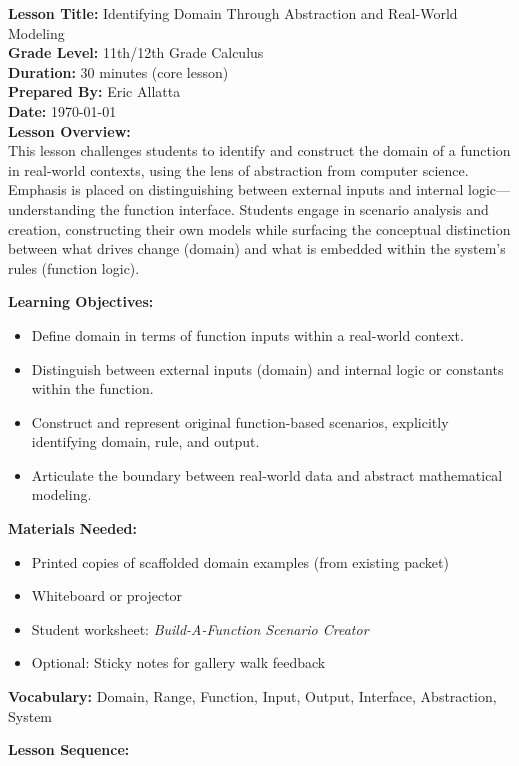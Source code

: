 \documentclass[12pt]{article}
\begin{document}
\textbf{Lesson Title:} Identifying Domain Through Abstraction and Real-World Modeling \\
\textbf{Grade Level:} 11th/12th Grade Calculus \\
\textbf{Duration:} 30 minutes (core lesson) \\
\textbf{Prepared By:} Eric Allatta \\
\textbf{Date:} \today \\

\textbf{Lesson Overview:} \\
This lesson challenges students to identify and construct the domain of a function in real-world contexts, using the lens of abstraction from computer science. Emphasis is placed on distinguishing between external inputs and internal logic—understanding the function interface. Students engage in scenario analysis and creation, constructing their own models while surfacing the conceptual distinction between what drives change (domain) and what is embedded within the system’s rules (function logic).

\textbf{Learning Objectives:}
\begin{itemize}[nosep]
  \item Define domain in terms of function inputs within a real-world context.
  \item Distinguish between external inputs (domain) and internal logic or constants within the function.
  \item Construct and represent original function-based scenarios, explicitly identifying domain, rule, and output.
  \item Articulate the boundary between real-world data and abstract mathematical modeling.
\end{itemize}

\textbf{Materials Needed:}
\begin{itemize}[nosep]
  \item Printed copies of scaffolded domain examples (from existing packet)
  \item Whiteboard or projector
  \item Student worksheet: \textit{Build-A-Function Scenario Creator}
  \item Optional: Sticky notes for gallery walk feedback
\end{itemize}

\textbf{Vocabulary:} Domain, Range, Function, Input, Output, Interface, Abstraction, System

\textbf{Lesson Sequence:}
\end{document}
